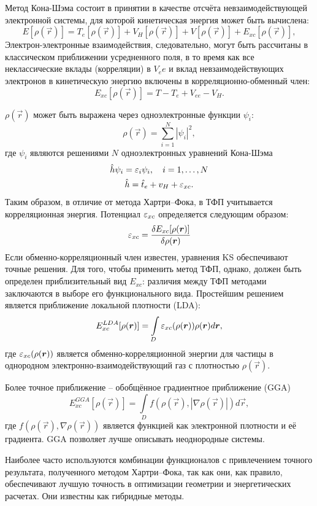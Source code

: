 Метод Кона-Шэма состоит в принятии в качестве отсчёта невзаимодействующей электронной системы, для которой кинетическая энергия может быть вычислена:
\begin{equation*}
    E[\rho(\vec{r})] = T_{e}[\rho(\vec{r})] + V_{H}[\rho(\vec{r})]
                     + V[\rho(\vec{r})] + E_{xc}[\rho(\vec{r})],
\end{equation*}
Электрон-электронные взаимодействия, следовательно, могут быть рассчитаны в классическом приближении усредненного поля, в то время как все неклассические вклады (корреляции) в \(V_ee\) и вклад невзаимодействующих электронов в кинетическую энергию включены в корреляционно-обменный член:
\begin{equation*}
    E_{xc}[\rho(\vec{r})] = T - T_{e} + V_{ee} - V_H.
    \label{eq:37}
\end{equation*}

\( \rho(\vec{r}) \)  может быть выражена через одноэлектронные функции \( \psi_i \):
\begin{equation*}
    \rho(\vec{r}) = \sum_{i=1}^N |\psi_i|^2,
\end{equation*}
где \(\psi_i\) являются решениями \( N \) одноэлектронных уравнений Кона-Шэма
\begin{gather*}
    \hat{h}\psi_i = \varepsilon_i\psi_i,\quad i=1,\ldots,N\\
    \hat{h} = \hat{t}_e + v_H + \varepsilon_{xc}.
\end{gather*}
Таким образом, в отличие от метода Хартри--Фока, в ТФП учитывается корреляционная энергия. Потенциал \(\varepsilon_{xc}\) определяется следующим образом:
\begin{equation*}
    \varepsilon_{xc} = \frac{\delta E_{xc}[\rho(\boldsymbol{r})]}{\delta\rho(\boldsymbol{r})}
\end{equation*}
Если обменно-корреляционный член известен, уравнения KS обеспечивают точные решения. Для того, чтобы применить метод ТФП, однако, должен быть определен приблизительный вид \(E_{xc}\): различия между ТФП методами заключаются в выборе его функционального вида. Простейшим решением является приближение локальной плотности (LDA):
\begin{equation*}
    E_{xc}^{LDA}[\rho(\boldsymbol{r})] = \int\limits_{D}\varepsilon_{xc}(\rho(\boldsymbol{r}))\rho(\boldsymbol{r}) d\boldsymbol{r},
\end{equation*}
где \(\varepsilon_{xc}(\rho(\boldsymbol{r}))\) является обменно-корреляционной энергии для частицы в однородном электронно-взаимодействующий газ с плотностью \(\rho(\vec{r})\).

Более точное приближение -- обобщённое градиентное приближение (GGA)
\begin{equation*}
    E_{xc}^{GGA}[\rho(\vec{r})] = \int\limits_{D}f(\rho(\vec{r}), |\nabla\rho(\vec{r})|) d\vec{r},
\end{equation*}
где \( f(\rho(\vec{r}), \nabla\rho(\vec{r})) \) является функцией как электронной плотности и её градиента. GGA позволяет лучше описывать неоднородные системы.

Наиболее часто используются комбинации функционалов с привлечением точного результата, полученного методом Хартри--Фока, так как они, как правило, обеспечивают лучшую точность в оптимизации геометрии и энергетических расчетах. Они известны как гибридные методы.\cite{dft}